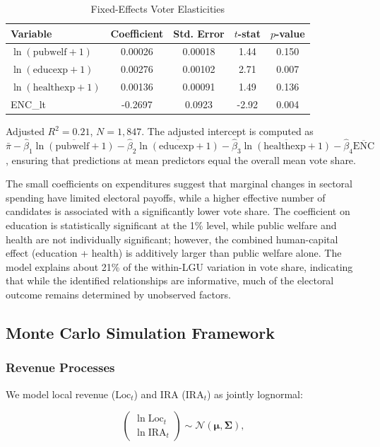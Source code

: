 \documentclass[twocolumn]{article}
\begin{document}
\begin{table}[ht]
\centering
\caption{Fixed-Effects Voter Elasticities}
\label{tab:elasticities}
\small
\begin{tabular}{lcccc}
\toprule
Variable & Coefficient & Std. Error & $t$-stat & $p$-value \\
\midrule
$\ln(\text{pubwelf}+1)$ & 0.00026 & 0.00018 & 1.44 & 0.150 \\
$\ln(\text{educexp}+1)$ & 0.00276 & 0.00102 & 2.71 & 0.007 \\
$\ln(\text{healthexp}+1)$ & 0.00136 & 0.00091 & 1.49 & 0.136 \\
ENC\_lt & -0.2697 & 0.0923 & -2.92 & 0.004 \\
\bottomrule
\end{tabular}
\par\smallskip
\footnotesize{Adjusted $R^2 = 0.21$, $N = 1,847$. The adjusted intercept is computed as $\bar{\pi} - \hat{\beta}_1\overline{\ln(\text{pubwelf}+1)} - \hat{\beta}_2\overline{\ln(\text{educexp}+1)} - \hat{\beta}_3\overline{\ln(\text{healthexp}+1)} - \hat{\beta}_4\overline{\text{ENC}}$, ensuring that predictions at mean predictors equal the overall mean vote share.}
\end{table}

The small coefficients on expenditures suggest that marginal changes in sectoral spending have limited electoral payoffs, while a higher effective number of candidates is associated with a significantly lower vote share. The coefficient on education is statistically significant at the 1\% level, while public welfare and health are not individually significant; however, the combined human-capital effect (education + health) is additively larger than public welfare alone. The model explains about 21\% of the within-LGU variation in vote share, indicating that while the identified relationships are informative, much of the electoral outcome remains determined by unobserved factors.

\subsection{Monte Carlo Simulation Framework}

\subsubsection{Revenue Processes}
We model local revenue ($\text{Loc}_t$) and IRA ($\text{IRA}_t$) as jointly lognormal:

\[
\begin{pmatrix}
\ln \text{Loc}_t \\
\ln \text{IRA}_t
\end{pmatrix} \sim \mathcal{N}\left( \boldsymbol{\mu}, \boldsymbol{\Sigma} \right),
\]
\end{document}
